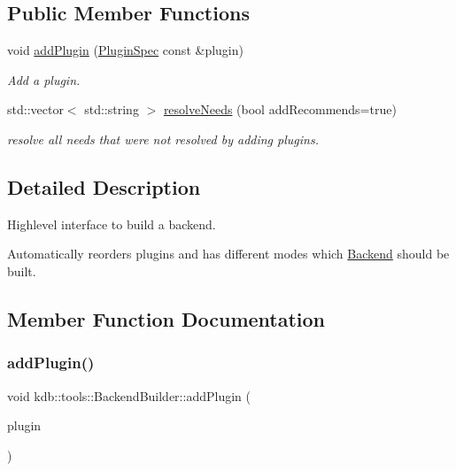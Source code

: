 \subsection*{Public Member Functions}
\begin{DoxyCompactItemize}
\item 
void \mbox{\hyperlink{classkdb_1_1tools_1_1BackendBuilder_a987d2c3711399e24b42c38e652c0e1c4}{add\+Plugin}} (\mbox{\hyperlink{classkdb_1_1tools_1_1PluginSpec}{Plugin\+Spec}} const \&plugin)
\begin{DoxyCompactList}\small\item\em Add a plugin. \end{DoxyCompactList}\item 
std\+::vector$<$ std\+::string $>$ \mbox{\hyperlink{classkdb_1_1tools_1_1BackendBuilder_a6e6c23716dc72ef68f8acfd71fc802a9}{resolve\+Needs}} (bool add\+Recommends=true)
\begin{DoxyCompactList}\small\item\em resolve all needs that were not resolved by adding plugins. \end{DoxyCompactList}\end{DoxyCompactItemize}


\subsection{Detailed Description}
Highlevel interface to build a backend. 

Automatically reorders plugins and has different modes which \mbox{\hyperlink{classkdb_1_1tools_1_1Backend}{Backend}} should be built. 

\subsection{Member Function Documentation}
\mbox{\label{classkdb_1_1tools_1_1BackendBuilder_a987d2c3711399e24b42c38e652c0e1c4}} 
\subsubsection{\texorpdfstring{addPlugin()}{addPlugin()}}
{\footnotesize\ttfamily void kdb\+::tools\+::\+Backend\+Builder\+::add\+Plugin (\begin{DoxyParamCaption}\item[{\mbox{\hyperlink{classkdb_1_1tools_1_1PluginSpec}{Plugin\+Spec}} const \&}]{plugin }\end{DoxyParamCaption})\hspace{0.3cm}{\ttfamily [virtual]}}



